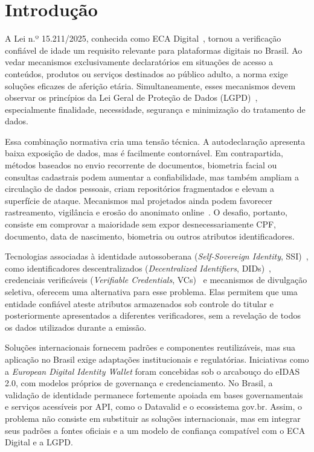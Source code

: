 \documentclass[12pt]{article}
\begin{document}
\section{Introdução}
\label{sec:intro}

A Lei n.º 15.211/2025, conhecida como ECA Digital~\cite{ecadigital2026}, tornou a verificação confiável de idade um requisito relevante para plataformas digitais no Brasil. Ao vedar mecanismos exclusivamente declaratórios em situações de acesso a conteúdos, produtos ou serviços destinados ao público adulto, a norma exige soluções eficazes de aferição etária. Simultaneamente, esses mecanismos devem observar os princípios da Lei Geral de Proteção de Dados (LGPD)~\cite{lgpd2018}, especialmente finalidade, necessidade, segurança e minimização do tratamento de dados.

Essa combinação normativa cria uma tensão técnica. A autodeclaração apresenta baixa exposição de dados, mas é facilmente contornável. Em contrapartida, métodos baseados no envio recorrente de documentos, biometria facial ou consultas cadastrais podem aumentar a confiabilidade, mas também ampliam a circulação de dados pessoais, criam repositórios fragmentados e elevam a superfície de ataque. Mecanismos mal projetados ainda podem favorecer rastreamento, vigilância e erosão do anonimato online~\cite{Moreira2023Vigilancia}. O desafio, portanto, consiste em comprovar a maioridade sem expor desnecessariamente CPF, documento, data de nascimento, biometria ou outros atributos identificadores.

Tecnologias associadas à identidade autossoberana (\textit{Self-Sovereign Identity}, SSI)~\cite{kuhn2018inevitable}, como identificadores descentralizados (\textit{Decentralized Identifiers}, DIDs)~\cite{w3cdid2022}, credenciais verificáveis (\textit{Verifiable Credentials}, VCs)~\cite{w3cvc2025} e mecanismos de divulgação seletiva, oferecem uma alternativa para esse problema. Elas permitem que uma entidade confiável ateste atributos armazenados sob controle do titular e posteriormente apresentados a diferentes verificadores, sem a revelação de todos os dados utilizados durante a emissão.

Soluções internacionais fornecem padrões e componentes reutilizáveis, mas sua aplicação no Brasil exige adaptações institucionais e regulatórias. Iniciativas como a \textit{European Digital Identity Wallet} foram concebidas sob o arcabouço do eIDAS 2.0, com modelos próprios de governança e credenciamento. No Brasil, a validação de identidade permanece fortemente apoiada em bases governamentais e serviços acessíveis por API, como o Datavalid e o ecossistema gov.br. Assim, o problema não consiste em substituir as soluções internacionais, mas em integrar seus padrões a fontes oficiais e a um modelo de confiança compatível com o ECA Digital e a LGPD.
\end{document}
